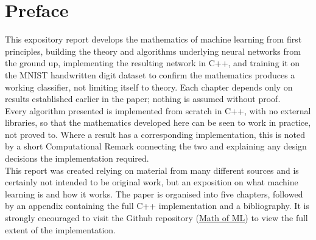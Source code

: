 \chapter*{Preface}

\indent \indent This expository report develops the mathematics of machine learning from first principles, building the theory and algorithms underlying neural networks from the ground up, implementing the resulting network in C++, and training it on the MNIST handwritten digit dataset to confirm the mathematics produces a working classifier, not limiting itself to theory. Each chapter depends only on results established earlier in the paper; nothing is assumed without proof. \\

\indent Every algorithm presented is implemented from scratch in C++, with no external libraries, so that the mathematics developed here can be seen to work in practice, not proved to. Where a result has a corresponding implementation, this is noted by a short Computational Remark connecting the two and explaining any design decisions the implementation required. \\

\indent This report was created relying on material from many different sources and is certainly not intended to be original work, but an exposition on what machine learning is and how it works. The paper is organised into five chapters, followed by an appendix containing the full C++ implementation and a bibliography. It is strongly encouraged to visit the Github repository (\href{https://www.github.com/rickdisi/math-of-ml}{Math of ML}) to view the full extent of the implementation. 